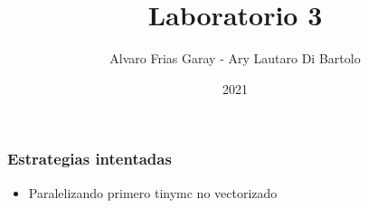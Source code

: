 \documentclass{beamer}
\title{Laboratorio 3}
\author{Alvaro Frias Garay - Ary Lautaro Di Bartolo}
\institute{Universidad Nacional de Córdoba - Universidad Nacional de Cuyo}
\date{2021}
\begin{document}
    \frame{\titlepage}

    \begin{frame}
        \frametitle{Estrategias intentadas}
        \begin{itemize}
            \item Paralelizando primero tinymc no vectorizado
        \end{itemize}
    \end{frame}
\end{document}
